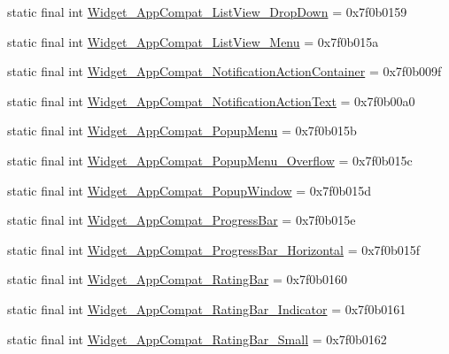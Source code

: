 \begin{CompactItemize}
\item 
static final int \hyperlink{classandroid_1_1support_1_1v7_1_1cardview_1_1_r_1_1style_d58d98c5bea05bdadc0497945253c9d0}{Widget\_\-AppCompat\_\-ListView\_\-DropDown} = 0x7f0b0159
\item 
static final int \hyperlink{classandroid_1_1support_1_1v7_1_1cardview_1_1_r_1_1style_13bf466c616c05ff692951386f1a633a}{Widget\_\-AppCompat\_\-ListView\_\-Menu} = 0x7f0b015a
\item 
static final int \hyperlink{classandroid_1_1support_1_1v7_1_1cardview_1_1_r_1_1style_e94c05482dd6c3fbc1592bcb10f62a11}{Widget\_\-AppCompat\_\-NotificationActionContainer} = 0x7f0b009f
\item 
static final int \hyperlink{classandroid_1_1support_1_1v7_1_1cardview_1_1_r_1_1style_7ce5a97dda384a17bff2324e5076563b}{Widget\_\-AppCompat\_\-NotificationActionText} = 0x7f0b00a0
\item 
static final int \hyperlink{classandroid_1_1support_1_1v7_1_1cardview_1_1_r_1_1style_5e6ebf71d7677fe6eab1f007f82a21bc}{Widget\_\-AppCompat\_\-PopupMenu} = 0x7f0b015b
\item 
static final int \hyperlink{classandroid_1_1support_1_1v7_1_1cardview_1_1_r_1_1style_428fb2fc6ed3f3464cacfb9305893641}{Widget\_\-AppCompat\_\-PopupMenu\_\-Overflow} = 0x7f0b015c
\item 
static final int \hyperlink{classandroid_1_1support_1_1v7_1_1cardview_1_1_r_1_1style_186ea350900db0b643e3df4ed45e17da}{Widget\_\-AppCompat\_\-PopupWindow} = 0x7f0b015d
\item 
static final int \hyperlink{classandroid_1_1support_1_1v7_1_1cardview_1_1_r_1_1style_69d13fffa16dc7bffb5af89af7c88098}{Widget\_\-AppCompat\_\-ProgressBar} = 0x7f0b015e
\item 
static final int \hyperlink{classandroid_1_1support_1_1v7_1_1cardview_1_1_r_1_1style_205d2009b502e00202f2d92ba71a4518}{Widget\_\-AppCompat\_\-ProgressBar\_\-Horizontal} = 0x7f0b015f
\item 
static final int \hyperlink{classandroid_1_1support_1_1v7_1_1cardview_1_1_r_1_1style_04678c1423bbe98a3db8ae418e540ba8}{Widget\_\-AppCompat\_\-RatingBar} = 0x7f0b0160
\item 
static final int \hyperlink{classandroid_1_1support_1_1v7_1_1cardview_1_1_r_1_1style_9982ac190ffc4333984a6240e4efdb3c}{Widget\_\-AppCompat\_\-RatingBar\_\-Indicator} = 0x7f0b0161
\item 
static final int \hyperlink{classandroid_1_1support_1_1v7_1_1cardview_1_1_r_1_1style_5a141bdbaec2a8f681c9c1d25743c22c}{Widget\_\-AppCompat\_\-RatingBar\_\-Small} = 0x7f0b0162

\end{CompactItemize}
